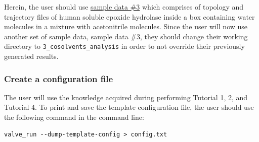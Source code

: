 \documentclass[9pt,tutorial, pubversion]{livecoms}
\begin{document}
Herein, the user should use \href{http://www.aquaduct.pl/sample-data/}{sample data \#3} which comprises of topology and trajectory files of human soluble epoxide hydrolase inside a box containing water molecules in a mixture with acetonitrile molecules. Since the user will now use another set of sample data, sample data \#3, they should change their working directory to \texttt{3\_cosolvents\_analysis} in order to not override their previously generated results.

\subsubsection{Create a configuration file}
The user will use the knowledge acquired during performing Tutorial 1, 2, and Tutorial 4. To print and save the template configuration file, the user should use the following command in the command line:
\begin{lstlisting}[columns=fullflexible]
valve_run --dump-template-config > config.txt
\end{lstlisting}
\end{document}

